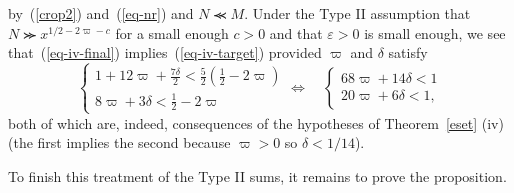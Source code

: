 \documentclass[12pt,a4paper,reqno]{amsart}
\numberwithin{equation}{section}
\theoremstyle{plain}
\theoremstyle{definition}
\newcommand\eps{\varepsilon}
\renewcommand{\lessapprox}{\llcurly}
\begin{document}
by~(\ref{crop2}) and~(\ref{eq-nr}) and $N\lessapprox M$. Under the
Type II assumption that $N\ggcurly x^{1/2-2\varpi-c}$ for a small
enough $c>0$ and that $\eps>0$ is small enough, we see
that~(\ref{eq-iv-final}) implies~(\ref{eq-iv-target}) provided
$\varpi$ and $\delta$ satisfy
$$
\begin{cases}
1+12\varpi+\frac{7\delta}{2}<\frac{5}{2}(\frac{1}{2}-2\varpi)\\
8\varpi+3\delta<\frac{1}{2}-2\varpi
\end{cases}
\Leftrightarrow\quad
\begin{cases}
68\varpi+14\delta<1\\
20\varpi+6\delta<1,
\end{cases}
$$
both of which are, indeed, consequences of the hypotheses of
Theorem~\ref{eset} (iv) (the first implies the second because
$\varpi>0$ so $\delta<1/14$).

To finish this treatment of the Type II sums, it remains to prove the
proposition.
\end{document}
